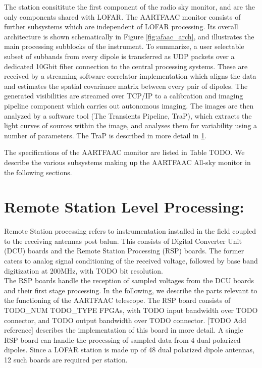 \documentclass{aa}
\begin{document}
The station  consititute the first component  of the radio sky  monitor, and are
the only components shared with LOFAR.  The AARTFAAC monitor consists of further
subsystems which are independent of  LOFAR processing.  Its overall architecture
is shown schematically in Figure  \ref{fig:afaac_arch}, and illustrates the main
processing subblocks of the instrument.   To summarize, a user selectable subset
of subbands  from every dipole  is transferred as  UDP packets over  a dedicated
10Gbit fiber connection  to the central processing systems.   These are received
by  a streaming  software correlator  implementation which  aligns the  data and
estimates  the spatial  covariance matrix  between every  pair of  dipoles.  The
generated visibilities  are streamed  over TCP/IP to  a calibration  and imaging
pipeline component  which carries out  autonomous imaging.  The images  are then
analyzed by a software tool (The  Transients Pipeline, TraP), which extracts the
light curves  of sources  within the  image, and  analyses them  for variability
using a number of parameters. The TraP is described in more detail in \ref{}.

The  specifications of  the  AARTFAAC  monitor are  listed  in  Table TODO.   We
describe the  various subsystems making up  the AARTFAAC All-sky monitor  in the
following sections.

\section {Remote Station Level Processing:} 
Remote  Station processing  refers  to instrumentation  installed  in the  field
coupled to the receiving antennas post balun. This consists of Digital Converter
Unit (DCU)  boards and the  Remote Station  Processing (RSP) boards.  The former
caters to analog  signal conditioning of the received voltage,  followed by base
band digitization  at 200MHz, with TODO bit resolution.\\

The RSP boards handle the reception of  sampled voltages from the DCU boards and
their first stage  processing. In the following, we describe  the parts relevant
to  the functioning  of  the  AARTFAAC telescope.   The  RSP  board consists  of
TODO_NUM TODO_TYPE  FPGAs, with  TODO input bandwidth  over TODO  connector, and
TODO output bandwidth  over TODO connector.  [TODO Add  reference] describes the
implementation of this board  in more detail. A single RSP  board can handle the
processing of sampled data from 4 dual polarized dipoles.  Since a LOFAR station
is made up of 48 dual polarized dipole antennas, 12 such boards are required per
station.\\
\end{document}
